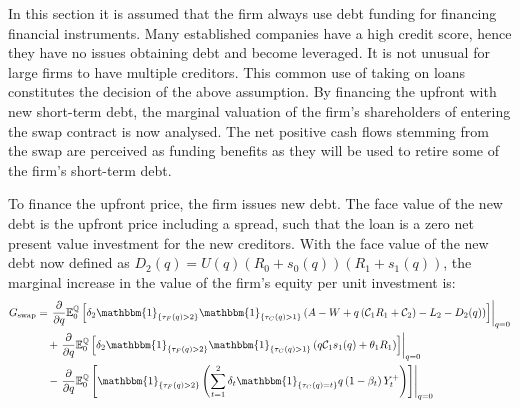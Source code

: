 \documentclass[main.tex]{subfiles}
\begin{document}
        In this section it is assumed that the firm always use debt funding for financing financial instruments.
        Many established companies have a high credit score,
        hence they have no issues obtaining debt and become leveraged.
        It is not unusual for large firms to have multiple creditors.
        This common use of taking on loans constitutes the decision of the above assumption.
        By financing the upfront with new short-term debt, the marginal valuation of the firm's shareholders of entering the swap contract is now analysed.
        The net positive cash flows stemming from the swap are perceived as funding benefits as they will be used to retire some of the firm's short-term debt.
        
        To finance the upfront price, the firm issues new debt.
        The face value of the new debt is the upfront price including a spread, 
        such that the loan is a zero net present value investment for the new creditors.
        With the face value of the new debt now defined as $D_{2}(q) = U(q)(R_{0} + s_{0}(q))(R_{1} + s_{1}(q))$,
        the marginal increase in the value of the firm's equity per unit investment is:
        \begin{align*}
            G_{\text{swap}} &=
            \left.\frac{\partial}{\partial q}
            \mathbb{E}_{0}^{\rnmeasure}\left[
                \delta_{2} \mathbbm{1}_{\{\tau_{F}(q)>2\}} \mathbbm{1}_{\{\tau_{C}(q)>1\}}
                \left(
                    A - W
                    + q\left(\mathcal{C}_{1} R_{1} + \mathcal{C}_{2}\right)
                    - L_{2}
                    - D_{2}(q)
                \right)
            \right]\right\rvert_{q=0}
            \nonumber
            \\
            &\quad+
            \left.\frac{\partial}{\partial q}
            \mathbb{E}_{0}^{\rnmeasure}\left[
                \delta_2 \mathbbm{1}_{\{\tau_{F}(q)>2\}} \mathbbm{1}_{\{\tau_{C}(q)>1\}}
                \left(q\mathcal{C}_{1} s_1(q) + \theta_{1}R_{1}\right)
            \right]\right\rvert_{q=0}
            \nonumber
            \\
            &\quad-
            \left.\frac{\partial}{\partial q}
            \mathbb{E}_{0}^{\rnmeasure}\left[
                \mathbbm{1}_{\{\tau_{F}(q)>2\}}
                \left(
                    \sum_{t=1}^{2} \delta_{t} \mathbbm{1}_{\{\tau_{C}(q)=t\}}q\left(1-\beta_t\right)Y_{t}^{+}
                \right)
            \right]\right\rvert_{q=0}
        \end{align*}
\end{document}
